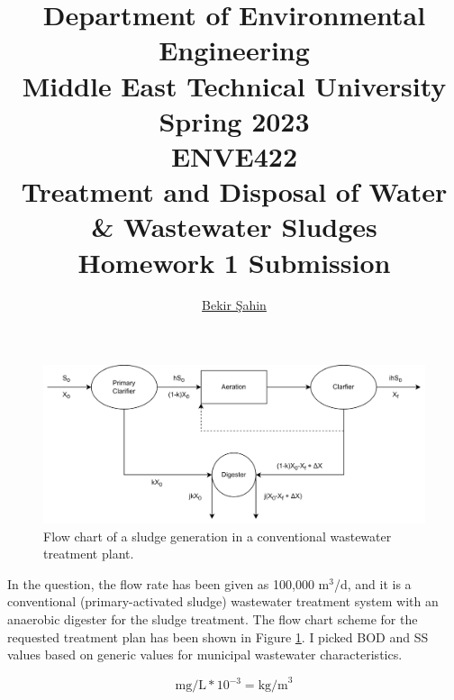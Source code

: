 \documentclass[a4paper]{article}
\title{Department of Environmental Engineering\\Middle East Technical University\\Spring 2023\\ENVE422\\Treatment and Disposal of Water \& Wastewater Sludges\\Homework 1 Submission} %
\author{\href{sahin.bekir@metu.edu.tr}{Bekir Şahin}} %
\begin{document}
\setcounter{page}{0}
\onehalfspacing
\maketitle %
\thispagestyle{empty}
\newpage
\section{} %
\begin{figure}[h]
    \centering
    \includegraphics[scale=0.75]{SludgeQuantities.png}
    \caption{Flow chart of a sludge generation in a conventional wastewater treatment plant.}
    \label{fig:SludgeQuantities}
\end{figure}
\begin{minipage}[c]{0.5\textwidth}
In the question, the flow rate has been given as 100,000 m$^3$/d, and it is a conventional (primary-activated sludge) wastewater treatment system with an anaerobic digester for the sludge treatment. The flow chart scheme for the requested treatment plan has been shown in Figure \ref{fig:SludgeQuantities}. I picked BOD and SS values based on generic values for municipal wastewater characteristics\autocite{sanin2011,vesilind1988,metcalf2014}.
\end{minipage}
\hfill
\begin{minipage}{0.4\textwidth}
\end{minipage}
\begin{equation}
\label{eq:conversion}
    \text{mg/L} * 10^{-3} = \text{kg/m}^3
\end{equation}
\end{document}
